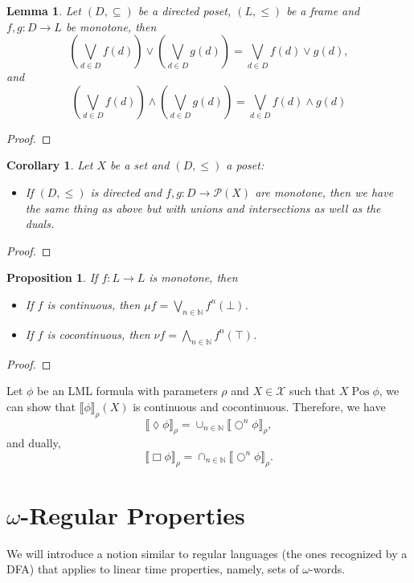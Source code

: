 \documentclass{tufte-handout} %
\newtheorem{cor}[thm]{Corollary}
\newtheorem{prop}[thm]{Proposition}
\newtheorem{lem}[thm]{Lemma}
\theoremstyle{definition}
\theoremstyle{remark}
\newcommand{\bra}[1]{\left(#1\right)}
\newcommand{\N}{\mathbb{N}}
\newcommand{\mP}{\mathcal{P}}
\newcommand{\0}{\textsf{0}}
\newcommand{\1}{\textsf{1}}
\newcommand{\mX}{\mathcal{X}}
\newcommand{\sem}[2]{\llbracket #1 \rrbracket_{#2}}
\newcommand{\Pos}{\mathrel{\text{Pos}}}
\begin{document}
\begin{lem}
	Let $(D, \subseteq)$ be a directed poset, $(L, \leq)$ be a frame and $f,g: D\rightarrow L$ be monotone, then 
	\[\bra{\bigvee_{d \in D} f(d)} \vee \bra{\bigvee_{d \in D} g(d)} = \bigvee_{d \in D} f(d) \vee g(d),\]
	and 
	\[\bra{\bigvee_{d \in D} f(d)} \wedge \bra{\bigvee_{d \in D} g(d)} = \bigvee_{d \in D} f(d) \wedge g(d)\]
\end{lem}
\begin{proof}
\end{proof}
\begin{cor}
	Let $X$ be a set and $(D, \leq)$ a poset:
	\begin{itemize}
		\item If $(D, \leq)$ is directed and $f,g: D\rightarrow \mP(X)$ are monotone, then we have the same thing as above but with unions and intersections as well as the duals.
	\end{itemize}
\end{cor}
\begin{proof}
\end{proof}
\begin{prop}
	If $f: L\rightarrow L$ is monotone, then 
	\begin{itemize}
		\item If $f$ is continuous, then $\mu f = \bigvee_{n \in \N} f^n(\bot)$.
		\item If $f$ is cocontinuous, then $\nu f = \bigwedge_{n \in \N} f^n(\top)$.
	\end{itemize}
\end{prop}
\begin{proof}
\end{proof}
Let $\phi$ be an LML formula with parameters $\rho$ and $X \in \mX$ such that $X \Pos \phi$, we can show that $\sem{\phi}{\rho}(X)$ is continuous and cocontinuous. Therefore, we have 
\[\sem{\lozenge \phi}{\rho} = \cup_{n \in \N} \sem{\bigcirc^n \phi}{\rho},\]
and dually,
\[\sem{\Box \phi}{\rho} = \cap_{n \in \N} \sem{\bigcirc^n \phi}{\rho}.\] 

\section*{$\omega$-Regular Properties}
We will introduce a notion similar to regular languages (the ones recognized by a DFA) that applies to linear time properties, namely, sets of $\omega$-words.
\end{document}
